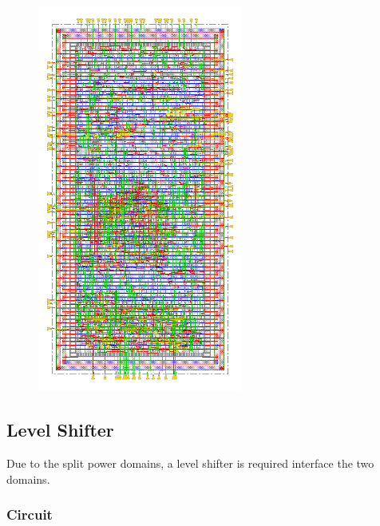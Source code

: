 			\begin{figure}[htb!]
			        \centering
			        \includegraphics[width=0.6\textwidth, angle=0]{./figs/pnr_digital}
			\end{figure}

	\FloatBarrier
	\subsection{Level Shifter}
	Due to the split power domains, a level shifter is required interface the two domains.

		\subsubsection{Circuit}

